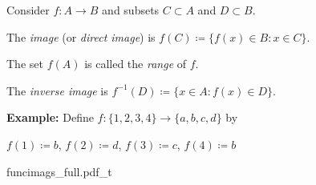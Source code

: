 \documentclass[10pt,aspectratio=169]{beamer}
\begin{document}
\begin{frame}
\begin{definition}
Consider $f \colon A \to B$ and subsets $C \subset A$ and $D \subset B$.

\pause
The \emph{image} (or \emph{direct image}) is
\quad $f(C) \coloneqq \bigl\{ f(x) \in B : x \in C \bigr\}$.

\pause
The set $f(A)$ is called the \emph{range} of $f$.

\pause
The \emph{inverse image} is \quad
$f^{-1}(D) \coloneqq \bigl\{ x \in A : f(x) \in D \bigr\}$.
\end{definition}

\pause

\textbf{Example:}
Define
$f \colon \{ 1,2,3,4 \} \to \{ a,b,c,d \}$ by

$f(1) \coloneqq b$,
$f(2) \coloneqq d$,
$f(3) \coloneqq c$,
$f(4) \coloneqq b$

{funcimags_full.pdf_t}

\end{frame}
\end{document}
